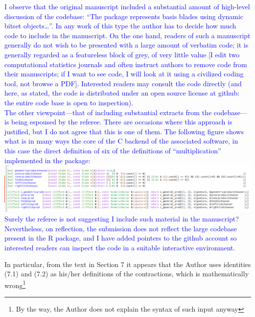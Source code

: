 \documentclass{article}
\begin{document}
\begin{itemize}
    \textcolor{blue}{I observe that the original manuscript included a
      substantial amount of high-level discussion of the codebase:
      ``The package represents basis blades using dynamic bitset
      objects\ldots''.  In any work of this type the author has to
      decide how much code to include in the manuscript.  On the one
      hand, readers of such a manuscript generally do not wish to be
      presented with a large amount of verbatim code; it is generally
      regarded as a featureless block of grey, of very little value [I
        edit two computational statistics journals and often instruct
        authors to remove code from their manuscripts; if I want to
        see code, I will look at it using a civilized coding tool, not
        browse a PDF].  Interested readers may consult the code
      directly (and here, as stated, the code is distributed under an
      open source license at github: the entire code base is open to
      inspection).\\[10pt] The other viewpoint---that of including
      substantial extracts from the codebase---is being espoused by
      the referee.  There are occasions where this approach is
      justified, but I do not agree that this is one of them.  The
      following figure shows what is in many ways the core of the C
      backend of the associated software, in this case the direct
      definition of six of the definitions of ``multiplication''
      implemented in the package:\\[10pt]
      \includegraphics[width=6in]{code.png}\\[10pt] Surely the referee
      is not suggesting I include such material in the manuscript?
      Nevertheless, on reflection, the submission does not reflect the
      large codebase present in the R package, and I have added
      pointers to the github account so interested readers can inspect
      the code in a suitable interactive environment.}
      
    In particular, from the text in Section 7 it appears that the
    Author uses identities (7.1) and (7.2) as his/her definitions of
    the contractions, which is mathematically wrong\footnote{By the
    way, the Author does not explain the syntax of such input anyway}


\end{itemize}
\end{document}
